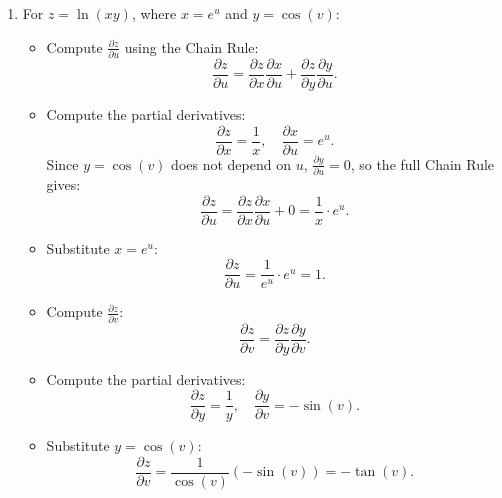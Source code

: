 \begin{example}
\begin{solution}
\begin{enumerate}
    \item For \( z = \ln(xy) \), where \( x = e^u \) and \( y = \cos(v) \):
    \begin{itemize}
        \item Compute \( \frac{\partial z}{\partial u} \) using the Chain Rule:
        \[
        \frac{\partial z}{\partial u} = \frac{\partial z}{\partial x} \frac{\partial x}{\partial u} + \frac{\partial z}{\partial y} \frac{\partial y}{\partial u}.
        \]
        \item Compute the partial derivatives:
        \[
        \frac{\partial z}{\partial x} = \frac{1}{x}, \quad \frac{\partial x}{\partial u} = e^u.
        \]
        Since \( y = \cos(v) \) does not depend on \( u \), \( \frac{\partial y}{\partial u} = 0 \), so the full Chain Rule gives:
        \[
        \frac{\partial z}{\partial u} = \frac{\partial z}{\partial x} \frac{\partial x}{\partial u} + 0 = \frac{1}{x} \cdot e^u.
        \]
        \item Substitute \( x = e^u \):
        \[
        \frac{\partial z}{\partial u} = \frac{1}{e^u} \cdot e^u = 1.
        \]
        \item Compute \( \frac{\partial z}{\partial v} \):
        \[
        \frac{\partial z}{\partial v} = \frac{\partial z}{\partial y} \frac{\partial y}{\partial v}.
        \]
        \item Compute the partial derivatives:
        \[
        \frac{\partial z}{\partial y} = \frac{1}{y}, \quad \frac{\partial y}{\partial v} = -\sin(v).
        \]
        \item Substitute \( y = \cos(v) \):
        \[
        \frac{\partial z}{\partial v} = \frac{1}{\cos(v)}(-\sin(v)) = -\tan(v).
        \]
    \end{itemize}
\end{enumerate}
\end{solution}
\end{example}
\exampleline

